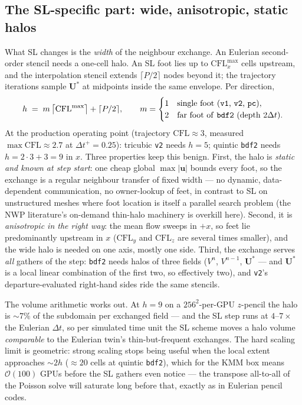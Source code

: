\documentclass[11pt,a4paper]{article}
\newcommand{\dtp}{\Delta t^{+}}
\newcommand{\bu}{\mathbf{u}}
\newcommand{\bU}{\mathbf{U}}
\begin{document}
\subsection{The SL-specific part: wide, anisotropic, static halos}

What SL changes is the \emph{width} of the neighbour exchange. An Eulerian
second-order stencil needs a one-cell halo. An SL foot lies up to
$\mathrm{CFL}^{\max}_{x}$ cells upstream, and the interpolation stencil
extends $\lceil P/2\rceil$ nodes beyond it; the trajectory iterations sample
$\bU^{*}$ at midpoints inside the same envelope. Per direction,
\begin{equation}
h \;=\; m\,\big\lceil \mathrm{CFL}^{\max} \big\rceil + \lceil P/2 \rceil,
\qquad
m = \begin{cases} 1 & \text{single foot (\texttt{v1}, \texttt{v2}, \texttt{pc})},\\
2 & \text{far foot of \texttt{bdf2} (depth } 2\Delta t).\end{cases}
\label{eq:halo}
\end{equation}
At the production operating point (trajectory $\mathrm{CFL}\approx3$,
measured $\max\mathrm{CFL}\approx2.7$ at $\dtp=0.25$): tricubic \texttt{v2}
needs $h=5$; quintic \texttt{bdf2} needs $h=2\cdot3+3=9$ in $x$. Three
properties keep this benign. First, the halo is \emph{static and known at
step start}: one cheap global $\max|\bu|$ bounds every foot, so the exchange
is a regular neighbour transfer of fixed width --- no dynamic, data-dependent
communication, no owner-lookup of feet, in contrast to SL on unstructured
meshes where foot location is itself a parallel search problem
(the NWP literature's on-demand thin-halo machinery \cite{staniforth91} is
overkill here). Second, it is \emph{anisotropic in the right way}: the mean
flow sweeps in $+x$, so feet lie predominantly upstream in $x$
($\mathrm{CFL}_y$ and $\mathrm{CFL}_z$ are several times smaller), and the
wide halo is needed on one axis, mostly one side. Third, the exchange
serves \emph{all} gathers of the step: \texttt{bdf2} needs halos of three
fields ($V^{n}$, $V^{n-1}$, $\bU^{*}$ --- and $\bU^{*}$ is a local linear
combination of the first two, so effectively two), and \texttt{v2}'s
departure-evaluated right-hand sides ride the same stencils.

The volume arithmetic works out. At $h=9$ on a $256^{2}$-per-GPU $z$-pencil
the halo is $\sim7\%$ of the subdomain per exchanged field --- and the SL
step runs at $4$--$7\times$ the Eulerian $\Delta t$, so per simulated time
unit the SL scheme moves a halo volume \emph{comparable} to the Eulerian
twin's thin-but-frequent exchanges. The hard scaling limit is geometric:
strong scaling stops being useful when the local extent approaches
$\sim2h$ ($\approx20$ cells at quintic \texttt{bdf2}), which for the KMM box
means $\mathcal O(100)$ GPUs before the SL gathers even notice ---
the transpose all-to-all of the Poisson solve will saturate long before
that, exactly as in Eulerian pencil codes.
\end{document}
